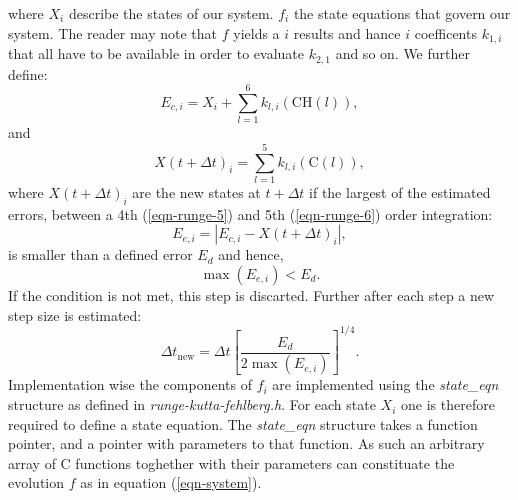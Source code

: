 \documentclass[a4paper,12pt]{article}
\begin{document}
where $X_i$ describe the states of our system. $f_i$ the state
equations that govern our system. The reader may note that $f$ yields
a $i$ results and hance $i$ coefficents $k_{1,i}$ that all have to be
available in order to evaluate $k_{2,1}$ and so on. We further define:
\begin{equation}
  E_{c,i} = X_i+\sum_{l=1}^6k_{l,i}(\mathrm{CH}(l)), \label{eqn-runge-5}
\end{equation}
and
\begin{equation}
  X(t+\Delta t)_i = \sum_{l=1}^5k_{l,i}(\mathrm{C}(l)), \label{eqn-runge-6}
\end{equation}
where $X(t+\Delta t)_i$ are the new states at $t+\Delta t$ if the largest
of the estimated errors, between a 4th (\ref{eqn-runge-5}) and 5th
(\ref{eqn-runge-6}) order integration:
\begin{equation}
  E_{e,i} = \left|E_{c,i}-X(t+\Delta t)_i\right|,
\end{equation}
is smaller than a defined error $E_d$ and hence,
\begin{equation}
  \max(E_{e,i}) < E_d. \label{eqn-rk-error-ineq}
\end{equation}
If the condition is not met, this step is discarted. Further after
each step a new step size is estimated:
\begin{equation}
  \Delta t_{\mathrm{new}} = \Delta t
  \left[\frac{E_d}{2\max(E_{e,i})}\right]^{1/4}. \label{eqn-rk-delta-update}
\end{equation}
Implementation wise the components of $f_i$ are implemented using
the \emph{state\_eqn} structure as defined in
\emph{runge-kutta-fehlberg.h}. For each state $X_i$ one is therefore
required to define a state equation. The \emph{state\_eqn} structure
takes a function pointer, and a pointer with parameters to that
function. As such an arbitrary array of C functions toghether with
their parameters can constituate the evolution $f$ as in equation
(\ref{eqn-system}).
\end{document}
